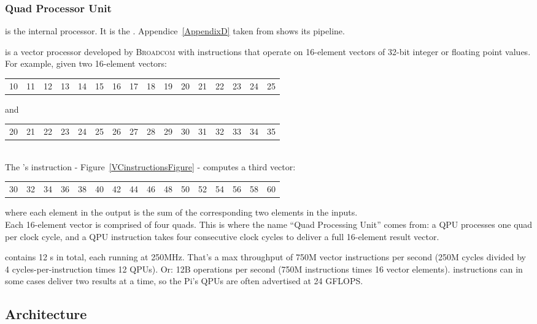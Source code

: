 \subsubsection{Quad Processor Unit}

\qpu{} is the \vc{} internal processor. It is the . Appendice~\ref{AppendixD} taken from \parencite{refVC} shows its pipeline.


\qpu{} is a  vector processor developed by \textsc{Broadcom} with instructions that operate on 16-element vectors of 32-bit integer or floating point values. For example, given two 16-element vectors:\\

\begin{tabular}{cccc|cccc|cccc|cccc}
	10&11&12&13&14&15&16&17&18&19&20&21&22&23&24&25
\end{tabular}

and

\begin{tabular}{cccc|cccc|cccc|cccc}
	20&21&22&23&24&25&26&27&28&29&30&31&32&33&34&35
\end{tabular}\\

The \qpu's  instruction - Figure~\ref{VCinstructionsFigure} - computes a third vector:

\begin{tabular}{cccc|cccc|cccc|cccc}
	30&32&34&36&38&40&42&44&46&48&50&52&54&56&58&60
\end{tabular}

where each element in the output is the sum of the corresponding two elements in the inputs.\\

Each 16-element vector is comprised of four quads. This is where the name ``Quad Processing Unit'' comes from: a QPU processes one quad per clock cycle, and a QPU instruction takes four consecutive clock cycles to deliver a full 16-element result vector.

\rasp{} contains 12 \qpu{}s in total, each running at 250MHz. That's a max throughput of 750M vector instructions per second (250M cycles divided by 4 cycles-per-instruction times 12 QPUs). Or: 12B operations per second (750M instructions times 16 vector elements). \qpu{} instructions can in some cases deliver two results at a time, so the Pi's QPUs are often advertised at 24 GFLOPS.
\newpage


\subsection{ Architecture}


